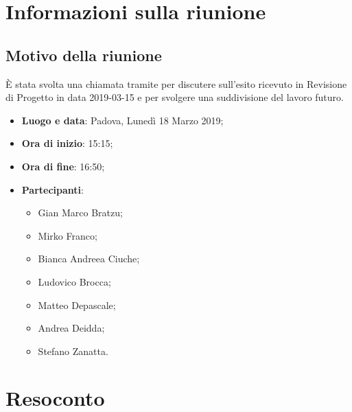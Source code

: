 \documentclass[a4paper,12pt]{article}
\begin{document}
	\tableofcontents
	\cleardoublepage
	\section{Informazioni sulla riunione}
	\subsection{Motivo della riunione} \`{E} stata svolta una chiamata tramite   per discutere sull'esito ricevuto in Revisione di Progetto in data 2019-03-15 e per svolgere una suddivisione del lavoro futuro.
	\begin{itemize}
		\item \textbf{Luogo e data}: Padova, Lunedì \label{key}18 Marzo 2019;
		\item \textbf{Ora di inizio}: 15:15;
		\item \textbf{Ora di fine}: 16:50;
		\item \textbf{Partecipanti}:  
		\begin{itemize}
			\item Gian Marco Bratzu;
			\item Mirko Franco;
			\item Bianca Andreea Ciuche;
			\item Ludovico Brocca;
			\item Matteo Depascale;
			\item Andrea Deidda;
			\item Stefano Zanatta.
		\end{itemize}
	\end{itemize}
	
	
	\section{Resoconto}
\end{document}
